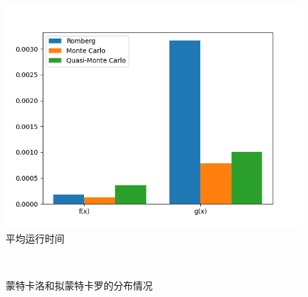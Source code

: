 \documentclass[a4paper,twoside]{article}
\begin{document}
\begin{spacing}{1.2}
\begin{figure}[H]
	\centering
	\label{fig:rubtimeaverage}
	\includegraphics[width=0.5\linewidth]{runtime.png}
	\caption{平均运行时间}
\end{figure}

\begin{figure}[H]
	\centering 
	~
	~ 
	\caption{蒙特卡洛和拟蒙特卡罗的分布情况} 
	\label{fig:variance}
\end{figure}


\end{spacing}
\end{document}
